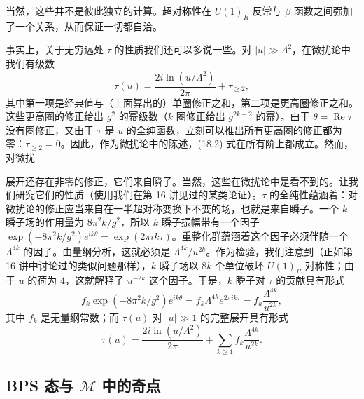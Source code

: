 当然，这些并不是彼此独立的计算。超对称性在 $U(1)_R$ 反常与 $\beta$ 函数之间强加了一个关系，从而保证一切都自洽。

事实上，关于无穷远处 $\tau$ 的性质我们还可以多说一些。对 $|u|\gg\Lambda^2$，在微扰论中我们有级数
\begin{equation}
\tag{18.4}
\label{eq:18-4}
\tau(u)=\frac{2i\ln(u/\Lambda^2)}{2\pi}+\tau_{\ge2},
\end{equation}
其中第一项是经典值与（上面算出的）单圈修正之和，第二项是更高圈修正之和。这些更高圈的修正给出 $g^2$ 的幂级数（$k$ 圈修正给出 $g^{2k-2}$ 的幂）。由于 $\theta=\operatorname{Re}\tau$ 没有圈修正，又由于 $\tau$ 是 $u$ 的全纯函数，立刻可以推出所有更高圈的修正都为零：$\tau_{\ge2}=0$。因此，作为微扰论中的陈述，(18.2) 式在所有阶上都成立。然而，对微扰

展开还存在非零的修正，它们来自瞬子。当然，这些在微扰论中是看不到的。让我们研究它们的性质（使用我们在第 16 讲见过的某类论证）。$\tau$ 的全纯性蕴涵着：对微扰论的修正应当来自在一半超对称变换下不变的场，也就是来自瞬子。一个 $k$ 瞬子场的作用量为 $8\pi^2k/g^2$，所以 $k$ 瞬子振幅带有一个因子 $\exp(-8\pi^2k/g^2)e^{ik\theta}=\exp(2\pi ik\tau)$。重整化群蕴涵着这个因子必须伴随一个 $\Lambda^{4k}$ 的因子。由量纲分析，这就必须是 $\Lambda^{4k}/u^{2k}$。作为检验，我们注意到（正如第 16 讲中讨论过的类似问题那样），$k$ 瞬子场以 $8k$ 个单位破坏 $U(1)_R$ 对称性；由于 $u$ 的荷为 $4$，这就解释了 $u^{-2k}$ 这个因子。于是，$k$ 瞬子对 $\tau$ 的贡献具有形式
\[
f_k\exp(-8\pi^2k/g^2)e^{ik\theta}=f_k\Lambda^{4k}e^{2\pi ik\tau}=f_k\frac{\Lambda^{4k}}{u^{2k}},
\]
其中 $f_k$ 是无量纲常数；而 $\tau(u)$ 对 $|u|\gg1$ 的完整展开具有形式
\begin{equation}
\tag{18.5}
\label{eq:18-5}
\tau(u)=\frac{2i\ln(u/\Lambda^2)}{2\pi}+\sum_{k\ge1}f_k\frac{\Lambda^{4k}}{u^{2k}}.
\end{equation}


\subsection{BPS 态与 $\mathcal{M}$ 中的奇点}

